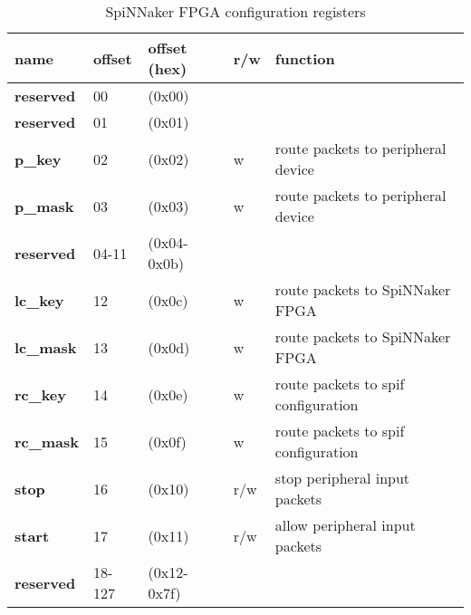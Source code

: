 \documentclass[11pt,a4paper,twoside]{article}
\begin{document}
\begin{center}
\begin{table}[!h]
	\begin{tabularx}{\textwidth}{| p{34mm} p{13mm} p{21mm} p{7mm} X |}
		\hline
		\textbf{name} & \textbf{offset} & \textbf{offset} (hex) & \textbf{r/w} & \textbf{function} \\%
		\hline
		\hline
		\cellcolor{gray!25}\textbf{reserved} & \cellcolor{gray!25}00     & \cellcolor{gray!25}(0x00)       & \cellcolor{gray!25} & \cellcolor{gray!25}\\%
		\cellcolor{gray!25}\textbf{reserved} & \cellcolor{gray!25}01     & \cellcolor{gray!25}(0x01)       & \cellcolor{gray!25} & \cellcolor{gray!25}\\%
		\textbf{p\_key}                      & 02                        & (0x02)                          & w                   & route packets to peripheral device             \\%
		\textbf{p\_mask}                     & 03                        & (0x03)                          & w                   & route packets to peripheral device             \\%
		\cellcolor{gray!25}\textbf{reserved} & \cellcolor{gray!25}04-11  & \cellcolor{gray!25} (0x04-0x0b) & \cellcolor{gray!25} & \cellcolor{gray!25}\\%
		\textbf{lc\_key}                     & 12                        & (0x0c)                          & w                   & route packets to SpiNNaker FPGA  \\%
		\textbf{lc\_mask}                    & 13                        & (0x0d)                          & w                   & route packets to SpiNNaker FPGA  \\%
		\textbf{rc\_key}                     & 14                        & (0x0e)                          & w                   & route packets to spif configuration   \\%
		\textbf{rc\_mask}                    & 15                        & (0x0f)                          & w                   & route packets to spif configuration   \\%
		\textbf{stop}                        & 16                        & (0x10)                          & r/w                 & stop peripheral input packets         \\%
		\textbf{start}                       & 17                        & (0x11)                          & r/w                 & allow peripheral input packets         \\%
		\cellcolor{gray!25}\textbf{reserved} & \cellcolor{gray!25}18-127 & \cellcolor{gray!25} (0x12-0x7f) & \cellcolor{gray!25} & \cellcolor{gray!25}\\%
		\hline
	\end{tabularx}
	\caption{SpiNNaker FPGA configuration registers}
	\label{tab:spin_regs}
\end{table}
\end{center}
\end{document}
